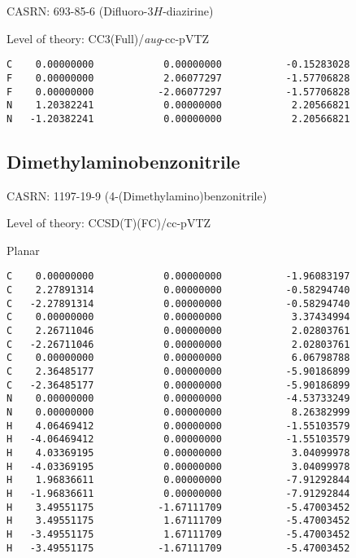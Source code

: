 \documentclass[journal=jctcce,manuscript=article,layout=traditional]{achemso}
\newcommand{\TZ}{cc-pVTZ}
\newcommand{\AVTZ}{\emph{aug}-cc-pVTZ}
\begin{document}
CASRN: 693-85-6 (Difluoro-3$H$-diazirine)

\begin{singlespace}
\noindent Level of theory: CC3(Full)/{\AVTZ}
\begin{verbatim}
C    0.00000000            0.00000000           -0.15283028
F    0.00000000            2.06077297           -1.57706828
F    0.00000000           -2.06077297           -1.57706828
N    1.20382241            0.00000000            2.20566821
N   -1.20382241            0.00000000            2.20566821
\end{verbatim}
\end{singlespace}

\subsection{Dimethylaminobenzonitrile}

CASRN: 1197-19-9 (4-(Dimethylamino)benzonitrile)

\begin{singlespace}
\noindent Level of theory: CCSD(T)(FC)/{\TZ}
\end{singlespace}

\begin{singlespace}
\noindent Planar
\begin{verbatim}
C    0.00000000            0.00000000           -1.96083197
C    2.27891314            0.00000000           -0.58294740
C   -2.27891314            0.00000000           -0.58294740
C    0.00000000            0.00000000            3.37434994
C    2.26711046            0.00000000            2.02803761
C   -2.26711046            0.00000000            2.02803761
C    0.00000000            0.00000000            6.06798788
C    2.36485177            0.00000000           -5.90186899
C   -2.36485177            0.00000000           -5.90186899
N    0.00000000            0.00000000           -4.53733249
N    0.00000000            0.00000000            8.26382999
H    4.06469412            0.00000000           -1.55103579
H   -4.06469412            0.00000000           -1.55103579
H    4.03369195            0.00000000            3.04099978
H   -4.03369195            0.00000000            3.04099978
H    1.96836611            0.00000000           -7.91292844
H   -1.96836611            0.00000000           -7.91292844
H    3.49551175           -1.67111709           -5.47003452
H    3.49551175            1.67111709           -5.47003452
H   -3.49551175            1.67111709           -5.47003452
H   -3.49551175           -1.67111709           -5.47003452
\end{verbatim}
\end{singlespace}
\end{document}
